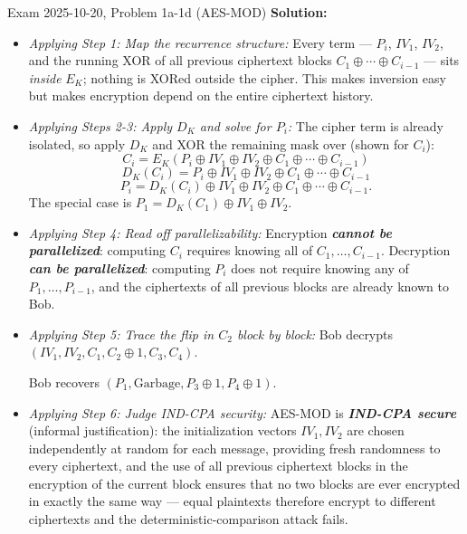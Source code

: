 \documentclass[12pt, a4paper]{article}
\newcommand{\term}[1]{\textbf{\textit{#1}}}        %
\begin{document}
\begin{practicebox}{Exam 2025-10-20, Problem 1a-1d (AES-MOD)}
\textbf{Solution:}
\begin{itemize}
    \item \textit{Applying Step 1: Map the recurrence structure:} Every term --- $P_i$, $IV_1$, $IV_2$, and the running XOR of all previous ciphertext blocks $C_1 \oplus \cdots \oplus C_{i-1}$ --- sits \emph{inside} $E_K$; nothing is XORed outside the cipher. This makes inversion easy but makes encryption depend on the entire ciphertext history.
    \item \textit{Applying Steps 2-3: Apply $D_K$ and solve for $P_i$:} The cipher term is already isolated, so apply $D_K$ and XOR the remaining mask over (shown for $C_i$): \[ C_i = E_K(P_i \oplus IV_1 \oplus IV_2 \oplus C_1 \oplus \cdots \oplus C_{i-1}) \] \[ D_K(C_i) = P_i \oplus IV_1 \oplus IV_2 \oplus C_1 \oplus \cdots \oplus C_{i-1} \] \[ P_i = D_K(C_i) \oplus IV_1 \oplus IV_2 \oplus C_1 \oplus \cdots \oplus C_{i-1}. \] The special case is $P_1 = D_K(C_1) \oplus IV_1 \oplus IV_2$.
    \item \textit{Applying Step 4: Read off parallelizability:} Encryption \term{cannot be parallelized}: computing $C_i$ requires knowing all of $C_1, \dots, C_{i-1}$. Decryption \term{can be parallelized}: computing $P_i$ does not require knowing any of $P_1, \dots, P_{i-1}$, and the ciphertexts of all previous blocks are already known to Bob.
    \item \textit{Applying Step 5: Trace the flip in $C_2$ block by block:} Bob decrypts $(IV_1, IV_2, C_1, C_2 \oplus 1, C_3, C_4)$.  Bob recovers $(P_1, \text{Garbage}, P_3 \oplus 1, P_4 \oplus 1)$.
    \item \textit{Applying Step 6: Judge IND-CPA security:} AES-MOD is \term{IND-CPA secure} (informal justification): the initialization vectors $IV_1, IV_2$ are chosen independently at random for each message, providing fresh randomness to every ciphertext, and the use of all previous ciphertext blocks in the encryption of the current block ensures that no two blocks are ever encrypted in exactly the same way --- equal plaintexts therefore encrypt to different ciphertexts and the deterministic-comparison attack fails.

\end{itemize}
\end{practicebox}
\end{document}
